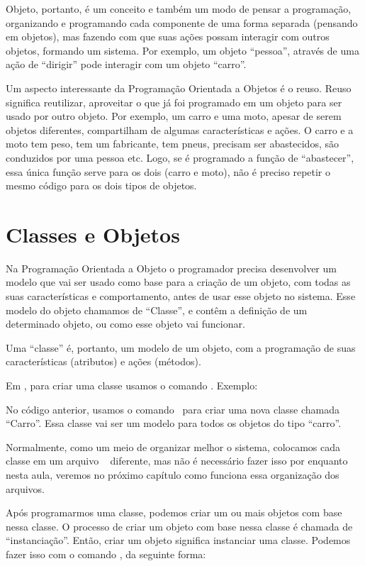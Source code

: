 Objeto, portanto, é um conceito e também um modo de pensar a programação, organizando e 
programando cada componente de uma forma separada (pensando em objetos), mas fazendo com 
que suas ações possam interagir com outros objetos, formando um sistema. Por exemplo, um 
objeto ``pessoa'', através de uma ação de ``dirigir'' pode interagir com um objeto ``carro''.

Um aspecto interessante da Programação Orientada a Objetos é o reuso. Reuso significa 
reutilizar, aproveitar o que já foi programado em um objeto para ser usado por outro objeto. 
Por exemplo, um carro e uma moto, apesar de serem objetos diferentes, compartilham de algumas 
características e ações. O carro e a moto tem peso, tem um fabricante, tem pneus, precisam 
ser abastecidos, são conduzidos por uma pessoa etc. Logo, se é programado a função de 
``abastecer'', essa única função serve para os dois (carro e moto), não é preciso repetir 
o mesmo código para os dois tipos de objetos.

\section{Classes e Objetos}
\label{classes-e-objetos}

Na Programação Orientada a Objeto o programador precisa desenvolver um modelo que vai ser 
usado como base para a criação de um objeto, com todas as suas características e comportamento, 
antes de usar esse objeto no sistema. Esse modelo do objeto chamamos de ``Classe'', e contêm 
a definição de um determinado objeto, ou como esse objeto vai funcionar. 

Uma ``classe'' é, portanto, um modelo de um objeto, com a programação de suas características 
(atributos) e ações (métodos).

Em \php, para criar uma classe usamos o comando \comandoclass. Exemplo:



No código anterior, usamos o comando \comandoclass~para criar uma nova classe chamada ``Carro''. Essa 
classe vai ser um modelo para todos os objetos do tipo ``carro''. 

Normalmente, como um meio de organizar melhor o sistema, colocamos cada classe em um arquivo \phpextensao~
diferente, mas não é necessário fazer isso por enquanto nesta aula, veremos no próximo capítulo 
como funciona essa organização dos arquivos.

Após programarmos uma classe, podemos criar um ou mais objetos com base nessa classe. O processo 
de criar um objeto com base nessa classe é chamada de ``instanciação''. Então, criar um objeto 
significa instanciar uma classe. Podemos fazer isso com o comando \comandonew, da seguinte 
forma:

